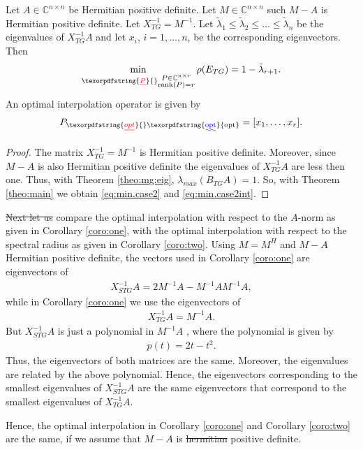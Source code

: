 \documentclass[final]{siamltex}
\newcommand{\beqo}{\begin{eqnarray*}}
\newcommand{\beq}{\begin{eqnarray}}
\newcommand{\eeqo}{\end{eqnarray*}}
\newcommand{\eeq}{\end{eqnarray}}
\numberwithin{equation}{section}
\newcommand{\Cnr}{\mathbb{C}^{n \times r}}
\newcommand{\inCnn}{\in \mathbb{C}^{n \times n}}
\providecommand{\DIFaddtex}[1]{{\protect\color{blue}\uwave{#1}}} %
\providecommand{\DIFdeltex}[1]{{\protect\color{red}\sout{#1}}}                      %
\providecommand{\DIFaddbegin}{} %
\providecommand{\DIFaddend}{} %
\providecommand{\DIFdelbegin}{} %
\providecommand{\DIFdelend}{} %
\providecommand{\DIFadd}[1]{\texorpdfstring{\DIFaddtex{#1}}{#1}} %
\providecommand{\DIFdel}[1]{\texorpdfstring{\DIFdeltex{#1}}{}} %
\newcommand{\DIFscaledelfig}{0.5}
\newlength{\DIFdelgraphicswidth} %
\newlength{\DIFdelgraphicsheight} %
\newcommand{\DIFaddincludegraphics}[2][]{{\color{blue}\fbox{\DIFOincludegraphics[#1]{#2}}}} %
\newcommand{\DIFdelincludegraphics}[2][]{%
\sbox{\DIFdelgraphicsbox}{\DIFOincludegraphics[#1]{#2}}%
\settoboxwidth{\DIFdelgraphicswidth}{\DIFdelgraphicsbox} %
\settoboxtotalheight{\DIFdelgraphicsheight}{\DIFdelgraphicsbox} %
\scalebox{\DIFscaledelfig}{%
\parbox[b]{\DIFdelgraphicswidth}{\usebox{\DIFdelgraphicsbox}\\[-\baselineskip] \rule{\DIFdelgraphicswidth}{0em}}\llap{\resizebox{\DIFdelgraphicswidth}{\DIFdelgraphicsheight}{%
\setlength{\unitlength}{\DIFdelgraphicswidth}%
\begin{picture}(1,1)%
\thicklines\linethickness{2pt} %
{\color[rgb]{1,0,0}\put(0,0){\framebox(1,1){}}}%
{\color[rgb]{1,0,0}\put(0,0){\line( 1,1){1}}}%
{\color[rgb]{1,0,0}\put(0,1){\line(1,-1){1}}}%
\end{picture}%
}\hspace*{3pt}}} %
} %
\DeclareRobustCommand{\DIFaddbegin}{\DIFOaddbegin \let\includegraphics\DIFaddincludegraphics} %
\DeclareRobustCommand{\DIFaddend}{\DIFOaddend \let\includegraphics\DIFOincludegraphics} %
\DeclareRobustCommand{\DIFdelbegin}{\DIFOdelbegin \let\includegraphics\DIFdelincludegraphics} %
\DeclareRobustCommand{\DIFdelend}{\DIFOaddend \let\includegraphics\DIFOincludegraphics} %
\begin{document}
\DIFdelend \begin{corollary} \label{coro:two}
Let  $A\inCnn$  be Hermitian positive definite. Let $ M \inCnn$ such $M - A$ is
Hermitian positive definite.
Let $X_{TG}^{-1} =  M^{-1}$.   
 Let $
\tilde \lambda_1 \leq \tilde \lambda_2 \leq \ldots \leq  \tilde \lambda_n $
be the  eigenvalues of $X_{TG}^{-1}A$  and let $x_i$, $i = 1, \ldots, n$, be
the corresponding eigenvectors. Then
\beq \label{eq:min.case2}
\min_{\DIFdelbegin \DIFdel{P}\DIFdelend \DIFaddbegin \substack{P \in \Cnr \\ \rank(P)=r}\DIFaddend }\rho(E_{TG}) = 1 - \tilde
\lambda_{r+1}.
\eeq
An optimal interpolation operator is given by 
\beq  \label{eq:min.case2int}
P_{\DIFdelbegin \DIFdel{opt}\DIFdelend \DIFaddbegin \DIFadd{\mathrm{opt}}\DIFaddend } = [x_{1}, \ldots , x_r].
\eeq
\end{corollary}
\begin{proof}
The matrix $X_{TG}^{-1} = M^{-1}$ is Hermitian positive definite. Moreover,
since $M - A$ is also Hermitian positive definite the eigenvalues of
$X_{TG}^{-1}A$ are less then  one. Thus, with Theorem \ref{theo:mg:eig},
\DIFdelbegin \DIFdel{$\lambda_{max}(B_{TG}A) = 1$}\DIFdelend \DIFaddbegin \DIFadd{$\lambda_{\max}(B_{TG}A) = 1$}\DIFaddend .  So, with  Theorem \ref{theo:main}  we obtain
\eqref{eq:min.case2} and \eqref{eq:min.case2int}.
\end{proof}

\DIFdelbegin \DIFdel{Next let us }\DIFdelend \DIFaddbegin \DIFadd{Now we will }\DIFaddend compare the optimal interpolation with respect to the $A$-norm as
given in Corollary \ref{coro:one}, with  the optimal interpolation with respect
to the spectral radius as given in Corollary \ref{coro:two}. Using $M=M^H$ and
$M - A$ Hermitian positive definite, the vectors used in  Corollary
\ref{coro:one}
are  eigenvectors of
\beqo
X^{-1}_{STG}A = 2M^{-1}A - M^{-1}AM^{-1}A,
\eeqo
while in Corollary \ref{coro:one} we use  the eigenvectors of
\beqo
X^{-1}_{TG}A = M^{-1}A.
\eeqo
But $X^{-1}_{STG}A$ is just a polynomial in $M^{-1}A$ , where   the polynomial
is given by
\beq \label{eq:pol}
p(t) = 2t - t^2.
\eeq
Thus, the eigenvectors of both matrices are the same. Moreover, the
eigenvalues are  related
by   the above polynomial. Hence, the eigenvectors corresponding  to the
smallest eigenvalues of
$X^{-1}_{STG}A$  are the same   eigenvectors that correspond to the smallest
eigenvalues of $X^{-1}_{TG}A$. \DIFdelbegin %

\DIFdelend Hence, the optimal interpolation in Corollary
\ref{coro:one}  and Corollary
\ref{coro:two} are the same, if we assume that $M - A$ is \DIFdelbegin \DIFdel{hermitian }\DIFdelend \DIFaddbegin \DIFadd{Hermitian }\DIFaddend positive
definite.
\end{document}
